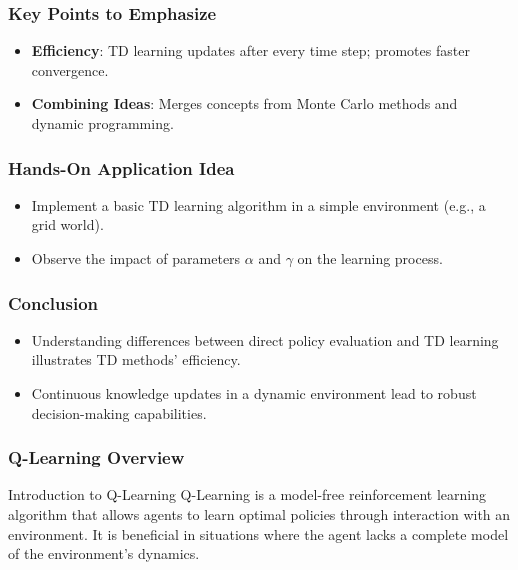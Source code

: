 \documentclass[aspectratio=169]{beamer}
\begin{document}
\begin{frame}[fragile]
    \frametitle{Key Points to Emphasize}
    \begin{itemize}
        \item \textbf{Efficiency}: TD learning updates after every time step; promotes faster convergence.
        \item \textbf{Combining Ideas}: Merges concepts from Monte Carlo methods and dynamic programming.
    \end{itemize}
\end{frame}

\begin{frame}[fragile]
    \frametitle{Hands-On Application Idea}
    \begin{itemize}
        \item Implement a basic TD learning algorithm in a simple environment (e.g., a grid world).
        \item Observe the impact of parameters $\alpha$ and $\gamma$ on the learning process.
    \end{itemize}
\end{frame}

\begin{frame}[fragile]
    \frametitle{Conclusion}
    \begin{itemize}
        \item Understanding differences between direct policy evaluation and TD learning illustrates TD methods' efficiency.
        \item Continuous knowledge updates in a dynamic environment lead to robust decision-making capabilities.
    \end{itemize}
\end{frame}

\begin{frame}[fragile]
    \frametitle{Q-Learning Overview}
    
    \begin{block}{Introduction to Q-Learning}
        Q-Learning is a model-free reinforcement learning algorithm that allows agents to learn optimal policies through interaction with an environment.
        It is beneficial in situations where the agent lacks a complete model of the environment's dynamics.
    \end{block}
\end{frame}
\end{document}
